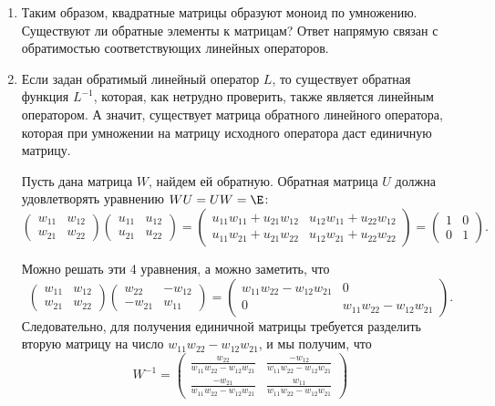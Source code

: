 \begin{enumerate}
\item Таким образом, квадратные матрицы образуют моноид по умножению. Существуют ли обратные элементы к матрицам? Ответ напрямую связан с обратимостью соответствующих линейных операторов.

\item Если задан обратимый линейный оператор $L$, то существует обратная функция $L^{-1}$, которая, как нетрудно проверить, также является линейным оператором. А значит, существует матрица обратного линейного оператора, которая при умножении на матрицу исходного оператора даст единичную матрицу.

Пусть дана матрица $W$, найдем ей обратную. Обратная матрица $U$ должна удовлетворять уравнению $WU=UW=\E$:
$$
\begin{pmatrix}
w_{11} & w_{12} \\ w_{21} & w_{22}
\end{pmatrix}
\begin{pmatrix}
u_{11} & u_{12} \\ u_{21} & u_{22}
\end{pmatrix}
=
\begin{pmatrix}
u_{11}w_{11} + u_{21}w_{12} & u_{12}w_{11} + u_{22}w_{12} \\ 
u_{11}w_{21} + u_{21}w_{22} & u_{12}w_{21} + u_{22}w_{22}
\end{pmatrix}
=\begin{pmatrix}
1 & 0 \\ 0 & 1
\end{pmatrix}.
$$

Можно решать эти 4 уравнения, а можно заметить, что
$$
\begin{pmatrix}
w_{11} & w_{12} \\ w_{21} & w_{22}
\end{pmatrix}
\begin{pmatrix}
w_{22} & -w_{12} \\ -w_{21} & w_{11}
\end{pmatrix}
=
\begin{pmatrix}
w_{11}w_{22} - w_{12}w_{21} & 0 \\ 
0 & w_{11}w_{22} - w_{12}w_{21}
\end{pmatrix}.
$$
Следовательно, для получения единичной матрицы требуется разделить вторую матрицу на число $w_{11}w_{22} - w_{12}w_{21}$, и мы получим, что
$$
W^{-1} = 
\begin{pmatrix}
\displaystyle\frac{w_{22}}{w_{11}w_{22} - w_{12}w_{21}} & \displaystyle\frac{-w_{12}}{w_{11}w_{22} - w_{12}w_{21}} \\[7pt]
\displaystyle\frac{-w_{21}}{w_{11}w_{22} - w_{12}w_{21}} & \displaystyle\frac{w_{11}}{w_{11}w_{22} - w_{12}w_{21}}
\end{pmatrix}
$$


\end{enumerate}
